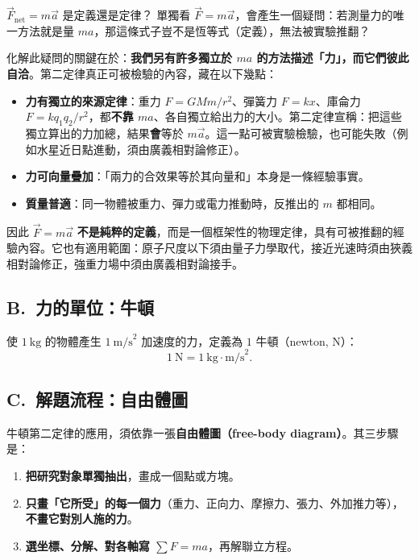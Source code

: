 \documentclass[11pt]{article}
\begin{document}
\begin{補充框}{$\vec F_{\text{net}}=m\vec a$ 是定義還是定律？}
單獨看 $\vec F=m\vec a$，會產生一個疑問：若測量力的唯一方法就是量 $ma$，那這條式子豈不是恆等式（定義），無法被實驗推翻？

化解此疑問的關鍵在於：\textbf{我們另有許多獨立於 $ma$ 的方法描述「力」，而它們彼此自洽}。第二定律真正可被檢驗的內容，藏在以下幾點：
\begin{itemize}\setlength{\itemsep}{1pt}
\item \textbf{力有獨立的來源定律}：重力 $F=GMm/r^2$、彈簧力 $F=kx$、庫侖力 $F=kq_1q_2/r^2$，都\textbf{不靠 $ma$}、各自獨立給出力的大小。第二定律宣稱：把這些獨立算出的力加總，結果\textbf{會}等於 $m\vec a$。這一點可被實驗檢驗，也可能失敗（例如水星近日點進動，須由廣義相對論修正）。
\item \textbf{力可向量疊加}：「兩力的合效果等於其向量和」本身是一條經驗事實。
\item \textbf{質量普適}：同一物體被重力、彈力或電力推動時，反推出的 $m$ 都相同。
\end{itemize}
因此 $\vec F=m\vec a$ \textbf{不是純粹的定義}，而是一個框架性的物理定律，具有可被推翻的經驗內容。它也有適用範圍：原子尺度以下須由量子力學取代，接近光速時須由狹義相對論修正，強重力場中須由廣義相對論接手。
\end{補充框}

\subsection*{\sffamily B.\ 力的單位：牛頓}

使 $1\ \text{kg}$ 的物體產生 $1\ \text{m/s}^2$ 加速度的力，定義為 $1$ 牛頓（newton, N）：
$$1\ \text{N} = 1\ \text{kg}\cdot\text{m/s}^2.$$

\subsection*{\sffamily C.\ 解題流程：自由體圖}

牛頓第二定律的應用，須依靠一張\textbf{自由體圖（free-body diagram）}。其三步驟是：
\begin{enumerate}\setlength{\itemsep}{1pt}
\item \textbf{把研究對象單獨抽出}，畫成一個點或方塊。
\item \textbf{只畫「它所受」的每一個力}（重力、正向力、摩擦力、張力、外加推力等），\textbf{不畫它對別人施的力}。
\item \textbf{選坐標、分解、對各軸寫 $\sum F = ma$}，再解聯立方程。
\end{enumerate}
\end{document}
